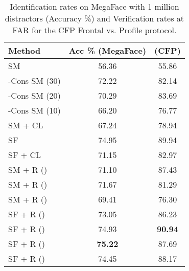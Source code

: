 \documentclass[10pt,twocolumn,letterpaper]{article}
\begin{document}
\begin{table}
\centering
\begin{tabular}{l  c c } 

\hline\hline Method   & Acc \% (MegaFace)  &   (CFP)  \\
\hline
\hline



SM    &     56.36  &   55.86   \\
-Cons SM (30) \cite{ranjan2017l2}   &  72.22 &   82.14   \\ 
-Cons SM (20) \cite{ranjan2017l2}   &   70.29    &  83.69  \\ 
-Cons SM (10) \cite{ranjan2017l2}   &   66.20   &   76.77  \\ 
SM + CL \cite{wen2016discriminative}   &  67.24     & 78.94   \\ 
SF   \cite{liu2017sphereface}   &   74.95  &   89.94  \\
SF + CL \cite{wen2016discriminative, liu2017sphereface}  &  71.15  &   82.97 \\


\hline
SM + R  ()    &  71.10  &  87.43  \\
SM + R  ()   &  71.67 &  81.29  \\
SM + R  ()  &   69.41  &  76.30  \\ 
\hline
SF + R  ()   &    73.05 & 86.23    \\ 
SF + R  ()   &     74.93  & \textbf{ 90.94}   \\ 
SF + R  ()   &   \textbf{ 75.22 } &  87.69   \\ 
SF + R  ()   &   74.45  &   88.17 \\ 





\hline
\end{tabular}
\caption{Identification rates on MegaFace with 1 million distractors (Accuracy \%) and Verification rates at  FAR for the CFP Frontal vs. Profile protocol.  }
\label{tab_megaface}

\end{table}
\end{document}
